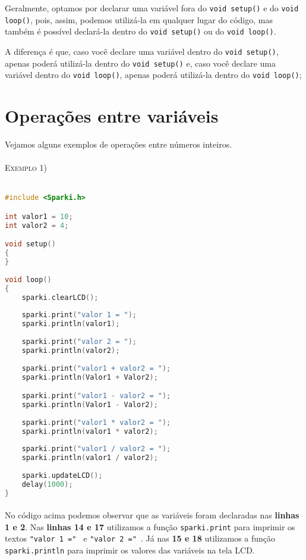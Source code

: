 Geralmente, optamos por declarar uma variável fora do \lstinline[columns=fixed]{void setup()} e do \lstinline[columns=fixed]{void loop()}, pois, assim, podemos utilizá-la em qualquer lugar do código, mas também é possível declará-la dentro do \lstinline[columns=fixed]{void setup()} ou do \lstinline[columns=fixed]{void loop()}. 

A diferença é que, caso você declare uma variável dentro do \lstinline[columns=fixed]{void setup()}, apenas poderá utilizá-la dentro do \lstinline[columns=fixed]{void setup()} e, caso você declare uma variável dentro do \lstinline[columns=fixed]{void loop()}, apenas poderá utilizá-la dentro do \lstinline[columns=fixed]{void loop()};

\section{Operações entre variáveis}
Vejamos alguns exemplos de operações entre números inteiros.
\\~\\
\textsc{Exemplo 1)}
\\~\\
\begin{lstlisting}[language=C]
#include <Sparki.h> 

int valor1 = 10;
int valor2 = 4;

void setup()
{
}
 
void loop()
{
    sparki.clearLCD();
 
    sparki.print("valor 1 = ");
    sparki.println(valor1);
 
    sparki.print("valor 2 = ");
    sparki.println(valor2);
 
    sparki.print("valor1 + valor2 = ");
    sparki.println(Valor1 + Valor2); 

    sparki.print("valor1 - valor2 = ");
    sparki.println(Valor1 - Valor2); 
 
    sparki.print("valor1 * valor2 = ");
    sparki.println(valor1 * valor2); 
 
    sparki.print("valor1 / valor2 = ");
    sparki.println(valor1 / valor2); 
 
    sparki.updateLCD();
    delay(1000); 
}
\end{lstlisting}

\paragraph{}
No código acima podemos observar que as variáveis foram declaradas nas \textbf{linhas 1 e 2}. Nas \textbf{linhas 14 e 17} utilizamos a função \lstinline[columns=fixed]{sparki.print} para imprimir os textos \lstinline[columns=fixed]{"valor 1 =" } e  \lstinline[columns=fixed]{"valor 2 =" }. Já nas \textbf{15 e 18} utilizamos a função \lstinline[columns=fixed]{sparki.println} para imprimir os valores das variáveis na tela LCD. 


